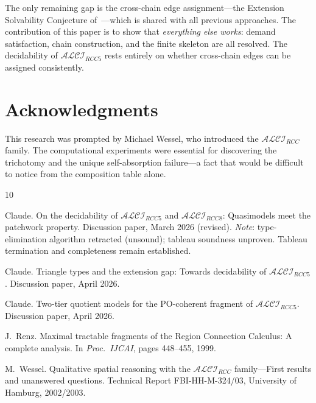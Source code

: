 \documentclass[a4paper,11pt]{article}
\theoremstyle{definition}
\newcommand{\ALCIRCC}[1]{\ensuremath{\mathcal{ALCI}_{\mathit{RCC#1}}}}
\begin{document}
The only remaining gap is the cross-chain edge assignment---the
Extension Solvability Conjecture of~\cite{TrianglePaper}---which
is shared with all previous approaches.  The contribution of this
paper is to show that \emph{everything else works}: demand
satisfaction, chain construction, and the finite skeleton are all
resolved.  The decidability of $\ALCIRCC{5}$ rests entirely on
whether cross-chain edges can be assigned consistently.


\section*{Acknowledgments}

This research was prompted by Michael Wessel, who introduced the
$\ALCIRCC{}$ family.  The computational experiments were essential
for discovering the trichotomy and the unique self-absorption
failure---a fact that would be difficult to notice from the
composition table alone.



\begin{thebibliography}{10}

Claude.
\newblock On the decidability of {$\mathcal{ALCI}_{\mathit{RCC5}}$} and
  {$\mathcal{ALCI}_{\mathit{RCC8}}$}: Quasimodels meet the patchwork
  property.
\newblock Discussion paper, March 2026 (revised).
\newblock \emph{Note}: type-elimination algorithm retracted (unsound);
  tableau soundness unproven.  Tableau termination and completeness
  remain established.

Claude.
\newblock Triangle types and the extension gap: Towards decidability of
  {$\mathcal{ALCI}_{\mathit{RCC5}}$}.
\newblock Discussion paper, April 2026.

Claude.
\newblock Two-tier quotient models for the PO-coherent fragment of
  {$\mathcal{ALCI}_{\mathit{RCC5}}$}.
\newblock Discussion paper, April 2026.

J.~Renz.
\newblock Maximal tractable fragments of the {Region Connection Calculus}: A
  complete analysis.
\newblock In {\em Proc.\ IJCAI}, pages 448--455, 1999.

M.~Wessel.
\newblock Qualitative spatial reasoning with the
  {$\mathcal{ALCI}_\mathit{RCC}$} family---{F}irst results and unanswered
  questions.
\newblock Technical Report FBI-HH-M-324/03, University of Hamburg, 2002/2003.

\end{thebibliography}
\end{document}
